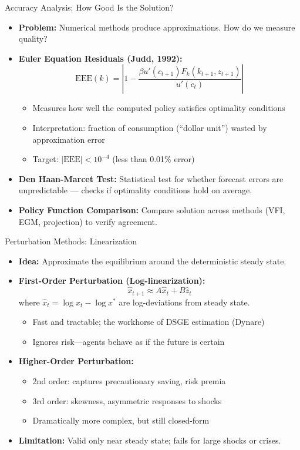 \documentclass[10pt,english,aspectratio=169]{beamer}
\begin{document}
\begin{frame}{Accuracy Analysis: How Good Is the Solution?}
\begin{itemize}
\item \textbf{Problem:} Numerical methods produce approximations. How do we measure quality?

\medskip
\item \textbf{Euler Equation Residuals (Judd, 1992):}
\[
\text{EEE}(k) = \left| 1 - \frac{\beta u'(c_{t+1}) F_k(k_{t+1}, z_{t+1})}{u'(c_t)} \right|
\]
\begin{itemize}
    \item Measures how well the computed policy satisfies optimality conditions
    \item Interpretation: fraction of consumption (``dollar unit'') wasted by approximation error
    \item Target: $|\text{EEE}| < 10^{-4}$ (less than 0.01\% error)
\end{itemize}

\medskip
\item \textbf{Den Haan-Marcet Test:} Statistical test for whether forecast errors are unpredictable --- checks if optimality conditions hold on average.

\medskip
\item \textbf{Policy Function Comparison:} Compare solution across methods (VFI, EGM, projection) to verify agreement.
\end{itemize}
\end{frame}

\begin{frame}{Perturbation Methods: Linearization}
\begin{itemize}
\item \textbf{Idea:} Approximate the equilibrium around the deterministic steady state.

\medskip
\item \textbf{First-Order Perturbation (Log-linearization):}
\[
\hat{x}_{t+1} \approx A \hat{x}_t + B \hat{z}_t
\]
where $\hat{x}_t = \log x_t - \log x^*$ are log-deviations from steady state.
\begin{itemize}
    \item Fast and tractable; the workhorse of DSGE estimation (Dynare)
    \item Ignores risk---agents behave as if the future is certain
\end{itemize}

\medskip
\item \textbf{Higher-Order Perturbation:}
\begin{itemize}
    \item 2nd order: captures precautionary saving, risk premia
    \item 3rd order: skewness, asymmetric responses to shocks
    \item Dramatically more complex, but still closed-form
\end{itemize}

\medskip
\item \textbf{Limitation:} Valid only near steady state; fails for large shocks or crises.
\end{itemize}
\end{frame}
\end{document}
